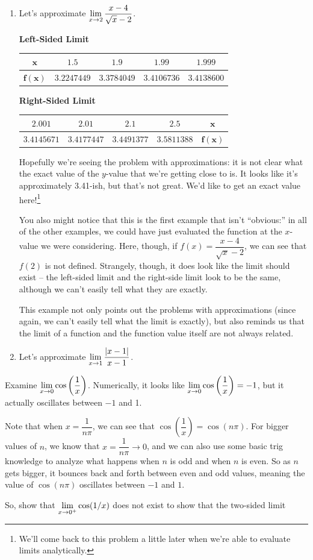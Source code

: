 \begin{enumerate}
  \item Let's approximate $\displaystyle \lim_{x\to 2} \dfrac{x-4}{\sqrt{x}-2}$.

  \textbf{Left-Sided Limit}

  \begin{tabular}{ccccc} \toprule
    $\bm{x}$ & $1.5$ & $1.9$ & $1.99$ & $1.999$ \\ \midrule
    $\bm{f(x)}$ & $3.2247449$ & $3.3784049$ & $3.4106736$ & $3.4138600$\\ \bottomrule
  \end{tabular}

  \begin{flushright}
    \textbf{Right-Sided Limit}

    \begin{tabular}{ccccc} \toprule
      $2.001$ & $2.01$ & $2.1$ & $2.5$ & $\bm{x}$ \\ \midrule
      $3.4145671$ & $3.4177447$ & $3.4491377$ & $3.5811388$ & $\bm{f(x)}$ \\ \bottomrule
    \end{tabular}
  \end{flushright}

  Hopefully we're seeing the problem with approximations: it is not clear what the exact value of the $y$-value that we're getting close to is.
  It looks like it's approximately 3.41-ish, but that's not great.
  We'd like to get an exact value here!\footnote{We'll come back to this problem a little later when we're able to evaluate limits analytically.}

  You also might notice that this is the first example that isn't ``obvious:'' in all of the other examples, we could have just evaluated the function at the $x$-value we were considering.
  Here, though, if $f(x) = \dfrac{x-4}{\sqrt{x}-2}$, we can see that $f(2)$ is not defined.
  Strangely, though, it does look like the limit should exist -- the left-sided limit and the right-side limit look to be the same, although we can't easily tell what they are exactly.

  This example not only points out the problems with approximations (since again, we can't easily tell what the limit is exactly), but also reminds us that the limit of a function and the function value itself are not always related.
  \item Let's approximate $\displaystyle \lim_{x\to 1} \dfrac{|x-1|}{x-1}$.
\end{enumerate}

Examine $\displaystyle \lim_{x\to 0} \cos\left(\dfrac{1}{x}\right)$.
Numerically, it looks like $\displaystyle \lim_{x\to 0} \cos\left(\dfrac{1}{x}\right)=-1$, but it actually oscillates between $-1$ and 1.

Note that when $x=\dfrac{1}{n\pi}$, we can see that  $\cos\left(\dfrac{1}{x}\right)=\cos(n\pi)$.
For bigger values of $n$, we know that $x=\dfrac{1}{n\pi} \to 0$, and we can also use some basic trig knowledge to analyze what happens when $n$ is odd and when $n$ is even.
So as $n$ gets bigger, it bounces back and forth between even and odd values, meaning the value of $\cos(n\pi)$ oscillates between $-1$ and $1$.

So, show that $\displaystyle \lim_{x\to0^+}\cos(1/x)$ does not exist to show that the two-sided limit
